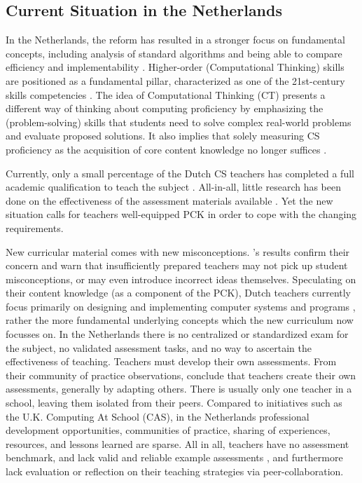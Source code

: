 \subsection{Current Situation in the Netherlands}
In the Netherlands, the reform has resulted in a stronger focus on fundamental concepts, including analysis of standard algorithms and being able to compare efficiency and implementability \cite{Barendsen2016}. Higher-order (Computational Thinking) skills are positioned as a fundamental pillar, characterized as one of the 21st-century skills competencies \cite{SLO2015}. The idea of Computational Thinking (CT) presents a different way of thinking about computing proficiency by emphasizing the (problem-solving) skills that students need to solve complex real-world problems and evaluate proposed solutions. It also implies that solely measuring CS proficiency as the acquisition of core content knowledge no longer suffices \cite{Yadav2015}.




Currently, only a small percentage of the Dutch CS teachers has completed a full academic qualification to teach the subject \cite{tolboom2014informatica}.
All-in-all, little research has been done on the effectiveness of the assessment materials available \cite{Yadav2016}. Yet the new situation calls for teachers well-equipped PCK in order to cope with the changing requirements.



New curricular material comes with new misconceptions. \citeauthor{duncan2017teachers}'s results confirm their concern and warn that insufficiently prepared teachers may not pick up student misconceptions, or may even introduce incorrect ideas themselves. Speculating on their content knowledge (as a component of the PCK), Dutch teachers currently focus primarily on designing and implementing computer systems and programs \cite{Schmidt2007}, rather the more fundamental underlying concepts which the new curriculum now focusses on. In the Netherlands there is no centralized or standardized exam for the subject, no validated assessment tasks, and no way to ascertain the effectiveness of teaching. Teachers must develop their own assessments. From their community of practice observations,  conclude that teachers create their own assessments, generally by adapting others. There is usually only one teacher in a school, leaving them isolated from their peers. Compared to initiatives such as the U.K. Computing At School (CAS), in the Netherlands professional development opportunities, communities of practice, sharing of experiences, resources, and lessons learned are sparse. All in all, teachers have no assessment benchmark, and lack valid and reliable example assessments \cite{Yadav2015}, and furthermore lack evaluation or reflection on their teaching strategies via peer-collaboration.




